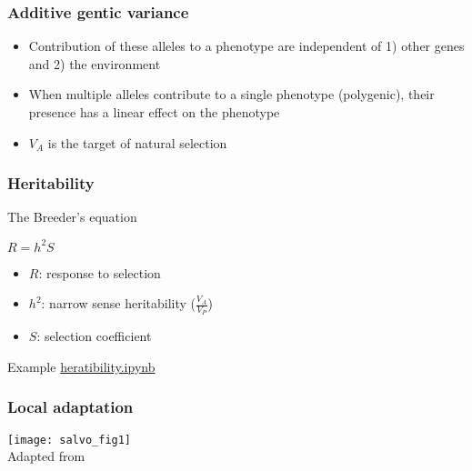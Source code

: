 \begin{frame}
\frametitle{Additive gentic variance}
\begin{block}{}
\begin{itemize}
\item{Contribution of these alleles to a phenotype are independent of 1) other
genes and 2) the environment}
\item{When multiple alleles contribute to a single phenotype (polygenic), their
presence has a linear effect on the phenotype}
\item{$V_A$ is the target of natural selection}
\end{itemize}
\end{block}{}
\end{frame}

\begin{frame}
\frametitle{Heritability}
\begin{block}{The Breeder's equation}
\begin{center}
\huge
$R = h^2S$
\end{center}
\begin{itemize}
\item[]{$R$: response to selection}
\item[]{$h^2$: narrow sense heritability ($\frac{V_A}{V_P}$)}
\item[]{$S$: selection coefficient}
\end{itemize}
\end{block}

\begin{block}{Example}
\href{http://localhost:8888/notebooks/heritability.ipynb}{heratibility.ipynb}
\end{block}
\end{frame}



\begin{frame}
\frametitle{Local adaptation}
\begin{block}{}
\centering
\texttt{[image: salvo\_fig1]}\\
Adapted from \citet[Figure 1]{Savolainen:2013dfa}
\end{block}
\end{frame}



